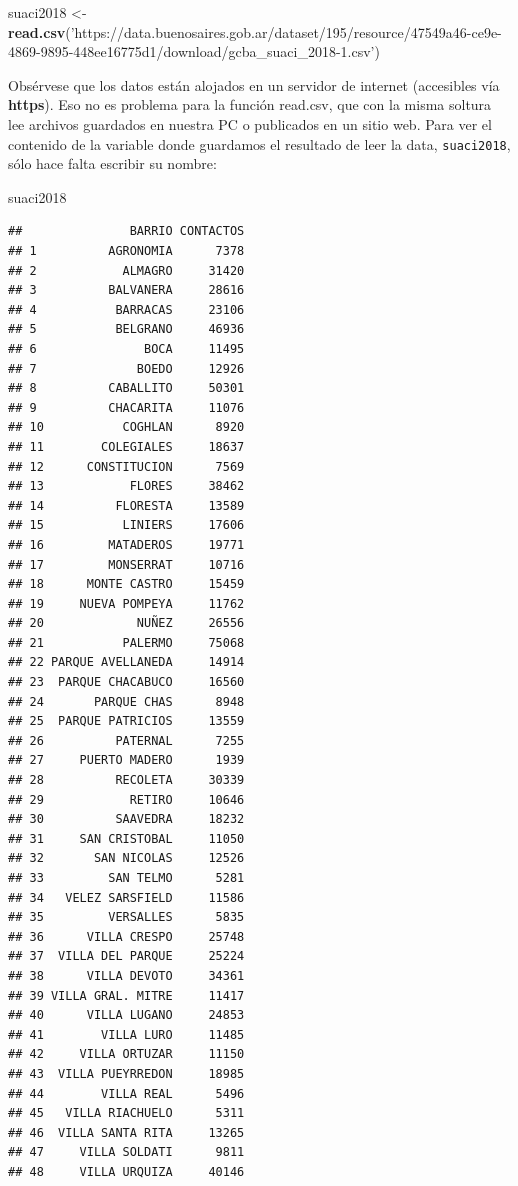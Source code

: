 \documentclass[]{book}
\newenvironment{Shaded}{\begin{snugshade}}{\end{snugshade}}
\newcommand{\KeywordTok}[1]{\textcolor[rgb]{0.13,0.29,0.53}{\textbf{#1}}}
\newcommand{\StringTok}[1]{\textcolor[rgb]{0.31,0.60,0.02}{#1}}
\newcommand{\NormalTok}[1]{#1}
\begin{document}
\begin{Shaded}
\begin{Highlighting}[]
\NormalTok{suaci2018 <-}\StringTok{ }\KeywordTok{read.csv}\NormalTok{(}\StringTok{'https://data.buenosaires.gob.ar/dataset/195/resource/47549a46-ce9e-4869-9895-448ee16775d1/download/gcba_suaci_2018-1.csv'}\NormalTok{)}
\end{Highlighting}
\end{Shaded}

Obsérvese que los datos están alojados en un servidor de internet
(accesibles vía \textbf{https}). Eso no es problema para la función
read.csv, que con la misma soltura lee archivos guardados en nuestra PC
o publicados en un sitio web. Para ver el contenido de la variable donde
guardamos el resultado de leer la data, \texttt{suaci2018}, sólo hace
falta escribir su nombre:

\begin{Shaded}
\begin{Highlighting}[]
\NormalTok{suaci2018}
\end{Highlighting}
\end{Shaded}

\begin{verbatim}
##               BARRIO CONTACTOS
## 1          AGRONOMIA      7378
## 2            ALMAGRO     31420
## 3          BALVANERA     28616
## 4           BARRACAS     23106
## 5           BELGRANO     46936
## 6               BOCA     11495
## 7              BOEDO     12926
## 8          CABALLITO     50301
## 9          CHACARITA     11076
## 10           COGHLAN      8920
## 11        COLEGIALES     18637
## 12      CONSTITUCION      7569
## 13            FLORES     38462
## 14          FLORESTA     13589
## 15           LINIERS     17606
## 16         MATADEROS     19771
## 17         MONSERRAT     10716
## 18      MONTE CASTRO     15459
## 19     NUEVA POMPEYA     11762
## 20             NUÑEZ     26556
## 21           PALERMO     75068
## 22 PARQUE AVELLANEDA     14914
## 23  PARQUE CHACABUCO     16560
## 24       PARQUE CHAS      8948
## 25  PARQUE PATRICIOS     13559
## 26          PATERNAL      7255
## 27     PUERTO MADERO      1939
## 28          RECOLETA     30339
## 29            RETIRO     10646
## 30          SAAVEDRA     18232
## 31     SAN CRISTOBAL     11050
## 32       SAN NICOLAS     12526
## 33         SAN TELMO      5281
## 34   VELEZ SARSFIELD     11586
## 35         VERSALLES      5835
## 36      VILLA CRESPO     25748
## 37  VILLA DEL PARQUE     25224
## 38      VILLA DEVOTO     34361
## 39 VILLA GRAL. MITRE     11417
## 40      VILLA LUGANO     24853
## 41        VILLA LURO     11485
## 42     VILLA ORTUZAR     11150
## 43  VILLA PUEYRREDON     18985
## 44        VILLA REAL      5496
## 45   VILLA RIACHUELO      5311
## 46  VILLA SANTA RITA     13265
## 47     VILLA SOLDATI      9811
## 48     VILLA URQUIZA     40146
\end{verbatim}
\end{document}
